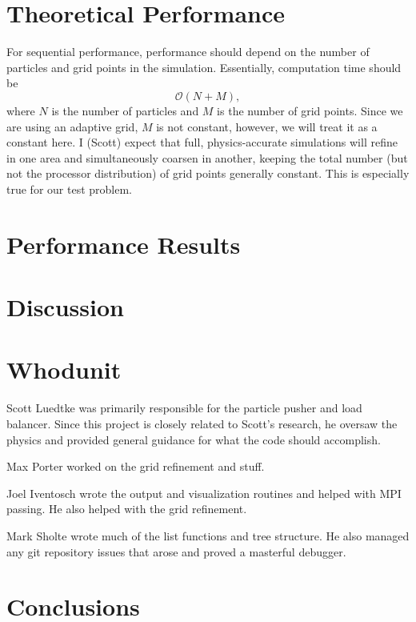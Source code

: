 \documentclass[]{article}
\begin{document}
\section{Theoretical Performance}
For sequential performance, performance should depend on the number of particles and grid points in the simulation.  Essentially, computation time should be 
\begin{equation}
\mathcal{O}(N + M),
\end{equation}
where $N$ is the number of particles and $M$ is the number of grid points.  Since we are using an adaptive grid, $M$ is not constant, however, we will treat it as a constant here.  I (Scott) expect that full, physics-accurate simulations will refine in one area and simultaneously coarsen in another, keeping the total number (but not the processor distribution) of grid points generally constant.  This is especially true for our test problem.

\section{Performance Results}

\section{Discussion}

\section{Whodunit}
Scott Luedtke was primarily responsible for the particle pusher and load balancer.  Since this project is closely related to Scott's research, he oversaw the physics and provided general guidance for what the code should accomplish.

Max Porter worked on the grid refinement and stuff.

Joel Iventosch wrote the output and visualization routines and helped with MPI passing.  He also helped with the grid refinement.

Mark Sholte wrote much of the list functions and tree structure.  He also managed any git repository issues that arose and proved a masterful debugger.

\section{Conclusions}
\end{document}
